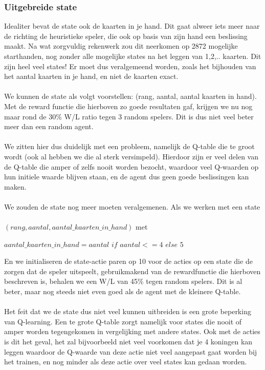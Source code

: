 \documentclass[11pt]{article}
\begin{document}
\subsubsection{Uitgebreide state}
Idealiter bevat de state ook de kaarten in je hand. Dit gaat alweer iets meer naar de richting de heuristieke speler, die ook op basis van zijn hand een beslissing maakt. Na wat zorgvuldig rekenwerk zou dit neerkomen op 2872 mogelijke starthanden, nog zonder alle mogelijke states na het leggen van 1,2,.. kaarten. Dit zijn heel veel states! Er moet dus veralgemeend worden, zoals het bijhouden van het aantal kaarten in je hand, en niet de kaarten exact.\\\\
We kunnen de state als volgt voorstellen: (rang, aantal, aantal kaarten in hand). Met de reward functie die hierboven zo goede resultaten gaf, krijgen we nu nog maar rond de 30\% W/L ratio tegen 3 random spelers. Dit is dus niet veel beter meer dan een random agent.\\\\
We zitten hier dus duidelijk met een probleem, namelijk de Q-table die te groot wordt (ook al hebben we die al sterk versimpeld). Hierdoor zijn er veel delen van de Q-table die amper of zelfs nooit worden bezocht, waardoor veel Q-waarden op hun initiele waarde blijven staan, en de agent dus geen goede beslissingen kan maken.\\\\
We zouden de state nog meer moeten veralgemenen. Als we werken met een state\\\\
\indent $(rang, aantal, aantal\_kaarten\_in\_hand)$ met
\begin{center}
$aantal\_kaarten\_in\_hand = aantal$ $if$ $ aantal <= 4$ $else$ $5$
\end{center}
En we initialiseren de state-actie paren op 10 voor de acties op een state die de zorgen dat de speler uitspeelt, gebruikmakend van de rewardfunctie die hierboven beschreven is, behalen we een W/L van 45\% tegen random spelers. Dit is al beter, maar nog steeds niet even goed als de agent met de kleinere Q-table.\\\\
Het feit dat we de state dus niet veel kunnen uitbreiden is een grote beperking van Q-learning. Een te grote Q-table zorgt namelijk voor states die nooit of amper worden tegengekomen in vergelijking met andere states. Ook met de acties is dit het geval, het zal bijvoorbeeld niet veel voorkomen dat je 4 koningen kan leggen waardoor de Q-waarde van deze actie niet veel aangepast gaat worden bij het trainen, en nog minder als deze actie over veel states kan gedaan worden. \\\\
\end{document}
